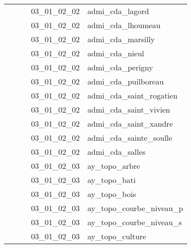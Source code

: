 \documentclass[12pt,titlepage]{book}
\begin{document}
\begin{supertabular}{|p{7.5cm}|p{7.5cm}|p{7.5cm}|c|p{10cm}|}
                   &                    &                    & 03\_01\_02\_02 & admi\_cda\_lagord\\
                   &                    &                    & 03\_01\_02\_02 & admi\_cda\_lhoumeau\\
                   &                    &                    & 03\_01\_02\_02 & admi\_cda\_marsilly\\
                   &                    &                    & 03\_01\_02\_02 & admi\_cda\_nieul\\
                   &                    &                    & 03\_01\_02\_02 & admi\_cda\_perigny\\
                   &                    &                    & 03\_01\_02\_02 & admi\_cda\_puilboreau\\
                   &                    &                    & 03\_01\_02\_02 & admi\_cda\_saint\_rogatien\\
                   &                    &                    & 03\_01\_02\_02 & admi\_cda\_saint\_vivien\\
                   &                    &                    & 03\_01\_02\_02 & admi\_cda\_saint\_xandre\\
                   &                    &                    & 03\_01\_02\_02 & admi\_cda\_sainte\_soulle\\
                   &                    &                    & 03\_01\_02\_02 & admi\_cda\_salles\\
                   &                    &                    & 03\_01\_02\_03 & ay\_topo\_arbre\\
                   &                    &                    & 03\_01\_02\_03 & ay\_topo\_bati\\
                   &                    &                    & 03\_01\_02\_03 & ay\_topo\_bois\\
                   &                    &                    & 03\_01\_02\_03 & ay\_topo\_courbe\_niveau\_p\\
                   &                    &                    & 03\_01\_02\_03 & ay\_topo\_courbe\_niveau\_s\\
                   &                    &                    & 03\_01\_02\_03 & ay\_topo\_culture\\

\end{supertabular}
\end{document}
